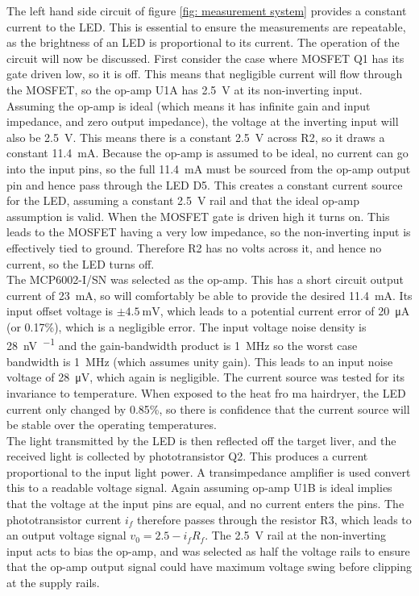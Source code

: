 The left hand side circuit of figure \ref{fig: measurement system} provides a constant current to the LED. This is essential to ensure the measurements are repeatable, as the brightness of an LED is proportional to its current. The operation of the circuit will now be discussed. First consider the case where MOSFET Q1 has its gate driven low, so it is off. This means that negligible current will flow through the MOSFET, so the op-amp U1A has \SI{2.5}{\volt} at its non-inverting input. Assuming the op-amp is ideal (which means it has infinite gain and input impedance, and zero output impedance), the voltage at the inverting input will also be \SI{2.5}{\volt}. This means there is a constant \SI{2.5}{\volt} across R2, so it draws a constant \SI{11.4}{\milli\ampere}. Because the op-amp is assumed to be ideal, no current can go into the input pins, so the full \SI{11.4}{\milli\ampere} must be sourced from the op-amp output pin and hence pass through the LED D5. This creates a constant current source for the LED, assuming a constant \SI{2.5}{\volt} rail and that the ideal op-amp assumption is valid. When the MOSFET gate is driven high it turns on. This leads to the MOSFET having a very low impedance, so the non-inverting input is effectively tied to ground. Therefore R2 has no volts across it, and hence no current, so the LED turns off.\\

The MCP6002-I/SN \cite{mcp6002} was selected as the op-amp. This has a short circuit output current of \SI{23}{\milli\ampere}, so will comfortably be able to provide the desired \SI{11.4}{\milli\ampere}. Its input offset voltage is $\pm\SI{4.5}{\milli\volt}$, which leads to a potential current error of \SI{20}{\micro\ampere} (or 0.17\%), which is a negligible error. The input voltage noise density is \SI{28}{\nano\volt\per\sqrt{\hertz}} and the gain-bandwidth product is \SI{1}{\mega\hertz} so the worst case bandwidth is \SI{1}{\mega\hertz} (which assumes unity gain). This leads to an input noise voltage of \SI{28}{\micro\volt}, which again is negligible. The current source was tested for its invariance to temperature. When exposed to the heat fro ma hairdryer, the LED current only changed by 0.85\%, so there is confidence that the current source will be stable over the operating temperatures.\\

The light transmitted by the LED is then reflected off the target liver, and the received light is collected by phototransistor Q2. This produces a current proportional to the input light power. A transimpedance amplifier is used convert this to a readable voltage signal. Again assuming op-amp U1B is ideal implies that the voltage at the input pins are equal, and no current enters the pins. The phototransistor current $i_f$ therefore passes through the resistor R3, which leads to an output voltage signal $v_0 = 2.5 - i_fR_f$. The \SI{2.5}{\volt} rail at the non-inverting input acts to bias the op-amp, and was selected as half the voltage rails to ensure that the op-amp output signal could have maximum voltage swing before clipping at the supply rails.\\

